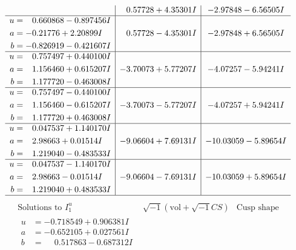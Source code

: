 \documentclass[1p]{elsarticle_modified}
\theoremstyle{definition}
\newcommand{\I}{\sqrt{-1}}
\begin{document}
$$\begin{array}{c|c|c}
 & \phantom{-}0.57728 + 4.35301 I & -2.97848 - 6.56505 I \\ \hline\begin{aligned}
u &= \phantom{-}0.660868 - 0.897456 I \\
a &= -0.21776 + 2.20899 I \\
b &= -0.826919 - 0.421607 I\end{aligned}
 & \phantom{-}0.57728 - 4.35301 I & -2.97848 + 6.56505 I \\ \hline\begin{aligned}
u &= \phantom{-}0.757497 + 0.440100 I \\
a &= \phantom{-}1.156460 + 0.615207 I \\
b &= \phantom{-}1.177720 - 0.463008 I\end{aligned}
 & -3.70073 + 5.77207 I & -4.07257 - 5.94241 I \\ \hline\begin{aligned}
u &= \phantom{-}0.757497 - 0.440100 I \\
a &= \phantom{-}1.156460 - 0.615207 I \\
b &= \phantom{-}1.177720 + 0.463008 I\end{aligned}
 & -3.70073 - 5.77207 I & -4.07257 + 5.94241 I \\ \hline\begin{aligned}
u &= \phantom{-}0.047537 + 1.140170 I \\
a &= \phantom{-}2.98663 + 0.01514 I \\
b &= \phantom{-}1.219040 - 0.483533 I\end{aligned}
 & -9.06604 + 7.69131 I & -10.03059 - 5.89654 I \\ \hline\begin{aligned}
u &= \phantom{-}0.047537 - 1.140170 I \\
a &= \phantom{-}2.98663 - 0.01514 I \\
b &= \phantom{-}1.219040 + 0.483533 I\end{aligned}
 & -9.06604 - 7.69131 I & -10.03059 + 5.89654 I\\
 \hline 
 \end{array}$$\newpage$$\begin{array}{c|c|c}  
\text{Solutions to }I^u_{1}& \I (\text{vol} + \sqrt{-1}CS) & \text{Cusp shape}\\
 \hline 
\begin{aligned}
u &= -0.718549 + 0.906381 I \\
a &= -0.652105 + 0.027561 I \\
b &= \phantom{-}0.517863 - 0.687312 I\end{aligned}

\end{array}$$
\end{document}
